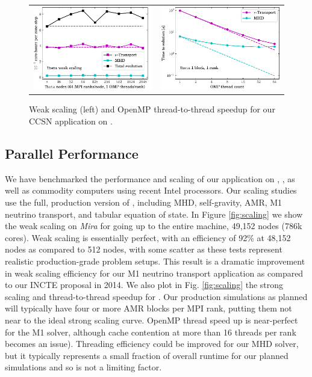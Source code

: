 \begin{figure}
  \begin{tabular}{ll}
    \includegraphics[width=3.2in]{figs/wkScaleSparkM1_theta} & \hspace{-16pt}
    \includegraphics[width=3.2in]{figs/thrdSpeedupSparkM1_theta}
  \end{tabular}
  \caption{Weak scaling (left) and OpenMP thread-to-thread speedup for our \sparkmone CCSN application on \thet.}
  \label{fig:thetaScaling}
\end{figure}


\subsection{Parallel Performance}
\label{sec:performance}


We have benchmarked the performance and scaling of our \sparkmone application on \mira, \thet, as well as commodity computers using recent Intel processors.
Our scaling studies use the full, production version of \sparkmone, including MHD, self-gravity, AMR, M1 neutrino transport, and tabular equation of state.
In Figure \ref{fig:scaling} we show the weak scaling on {\it Mira} for \sparkmone going up to the entire machine, 49,152 nodes (786k cores).
Weak scaling is essentially perfect, with an efficiency of 92\% at 48,152 nodes as compared to 512 nodes, with some scatter as these tests represent realistic production-grade problem setups.
This result is a dramatic improvement in weak scaling efficiency for our M1 neutrino transport application as compared to our INCTE proposal in 2014.
We also plot in Fig. \ref{fig:scaling} the strong scaling and thread-to-thread speedup for \sparkmone.
Our production simulations as planned will typically have four or more AMR blocks per MPI rank, putting them not near to the ideal strong scaling curve.
OpenMP thread speed up is near-perfect for the M1 solver, although cache contention at more than 16 threads per rank becomes an issue).
Threading efficiency could be improved for our MHD solver, but it typically represents a small fraction of overall runtime for our planned simulations and so is not a limiting factor.

